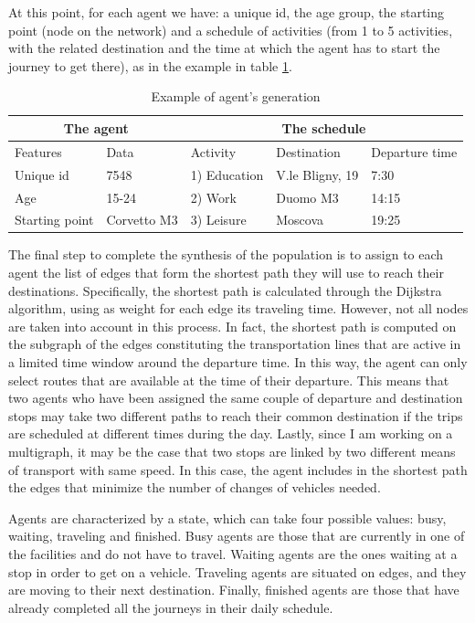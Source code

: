 At this point, for each agent we have: a unique id, the age group, the starting point (node on the network) and a schedule of activities (from 1 to 5 activities, with the related destination and the time at which the agent has to start the journey to get there), as in the example in table \ref{tab1}. 


\begin{table}
\centering
\label{tab1}
\begin{tabular}{ll|lll}
\multicolumn{2}{c|}{The agent} & \multicolumn{3}{c}{The schedule} \\ 
\toprule
Features      & Data      & Activity & Destination & Departure time \\ 
\midrule
Unique id & 7548 & 1) Education & V.le Bligny, 19 & 7:30\\
Age & 15-24  &  2) Work	& Duomo M3 & 14:15\\
Starting point & Corvetto M3 & 3) Leisure & Moscova & 19:25\\
\bottomrule
\end{tabular}
\caption{Example of agent's generation}
\end{table}

The final step to complete the synthesis of the population is to assign to each agent the list of edges that form the shortest path they will use to reach their destinations. Specifically, the shortest path is calculated through the Dijkstra algorithm, using as weight for each edge its traveling time. However, not all nodes are taken into account in this process. In fact, the shortest path is computed on the subgraph of the edges constituting the transportation lines that are active in a limited time window around the departure time. In this way, the agent can only select routes that are available at the time of their departure. This means that two agents who have been assigned the same couple of departure and destination stops may take two different paths to reach their common destination if the trips are scheduled at different times during the day. Lastly, since I am working on a multigraph, it may be the case that two stops are linked by two different means of transport with same speed. In this case, the agent includes in the shortest path the edges that minimize the number of changes of vehicles needed. 


Agents are characterized by a state, which can take four possible values: busy, waiting, traveling and finished. Busy agents are those that are currently in one of the facilities and do not have to travel. Waiting agents are the ones waiting at a stop in order to get on a vehicle. Traveling agents are situated on edges, and they are moving to their next destination. Finally, finished agents are those that have already completed all the journeys in their daily schedule. 


